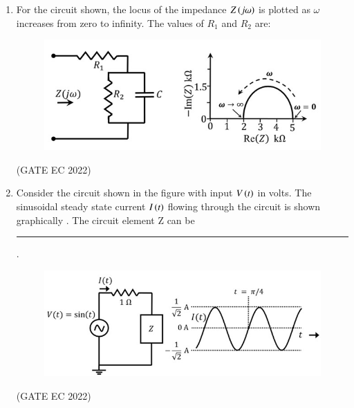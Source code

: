 \documentclass[journal,12pt,onecolumn]{IEEEtran}
\theoremstyle{remark}
\begin{document}
\begin{enumerate}
    \item For the circuit shown,  the locus of the impedance $Z\left(j\omega\right)$ is plotted as $\omega$ increases from zero to infinity. The values of $R_1$ and $R_2$ are:
    \begin{figure}[H]
        \centering
        \includegraphics[width=0.5\columnwidth]{figs/m17.jpg}
        \caption*{}
        \label{fig:m17}
    \end{figure}
    
    \hfill{(GATE EC 2022)}
    \begin{enumerate}
    \end{enumerate}

    \item Consider the circuit shown in the figure  with input $V\left(t\right)$ in volts. The sinusoidal steady state current $I\left(t\right)$ flowing through the circuit is shown graphically . The circuit element Z can be \rule{2cm}{0.4pt}.
    \begin{figure}[H]
        \centering
        \includegraphics[width=0.5\columnwidth]{figs/m18.jpg}
        \caption*{}
        \label{fig:m18}
    \end{figure}
    
    \hfill{(GATE EC 2022)}
    \begin{enumerate}
    \end{enumerate}


\end{enumerate}
\end{document}
